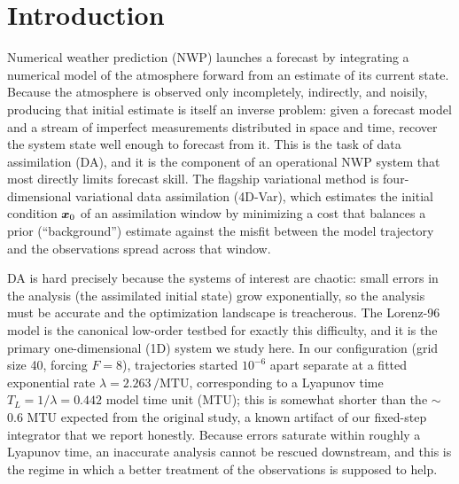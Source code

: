 \section{Introduction}

Numerical weather prediction (NWP) launches a forecast by integrating a numerical
model of the atmosphere forward from an estimate of its current state. Because the
atmosphere is observed only incompletely, indirectly, and noisily, producing that
initial estimate is itself an inverse problem: given a forecast model and a stream of
imperfect measurements distributed in space and time, recover the system state well
enough to forecast from it. This is the task of data assimilation (DA), and it is the
component of an operational NWP system that most directly limits forecast skill.
The flagship variational method is
four-dimensional variational data assimilation (4D-Var), which estimates the initial
condition $\bm{x}_0$ of an assimilation window by minimizing a cost that balances a
prior (``background'') estimate against the misfit between the model trajectory and the
observations spread across that window.

DA is hard precisely because the systems of interest are chaotic: small errors in the
analysis (the assimilated initial state) grow exponentially, so the analysis must be
accurate and the optimization landscape is treacherous. The Lorenz-96 model
is the canonical low-order testbed for exactly this
difficulty, and it is the primary one-dimensional (1D) system we study here. In our
configuration (grid size 40, forcing $F=8$), trajectories started $10^{-6}$ apart
separate at a fitted exponential rate $\lambda = 2.263\,/\mathrm{MTU}$, corresponding to
a Lyapunov time $T_L = 1/\lambda = 0.442$ model time unit (MTU); this is somewhat
shorter than the $\sim$0.6 MTU expected from the original study, a known artifact of our
fixed-step integrator that we report honestly. Because errors saturate within roughly a
Lyapunov time, an inaccurate analysis cannot be rescued downstream, and this is the
regime in which a better treatment of the observations is supposed to help.

